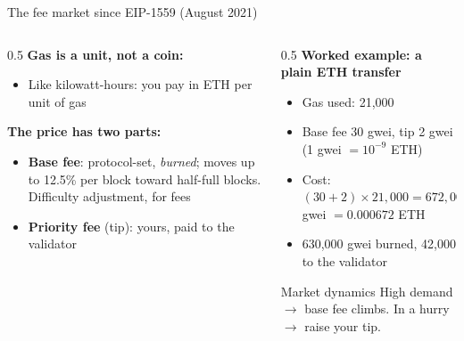 \ifdefined\PRESENTATION\else\PassOptionsToClass{handout}{beamer}\fi\documentclass[aspectratio=169, lualatex]{beamer}
\begin{document}
\begin{frame}{The fee market since EIP-1559 (August 2021)}
	\begin{columns}[c]
		\begin{column}{0.5\textwidth}
			\textbf{Gas is a unit, not a coin:}
			\begin{itemize}
				\item Like kilowatt-hours: you pay in ETH per unit of gas
			\end{itemize}
			\textbf{The price has two parts:}
			\begin{itemize}
				\item \textbf{Base fee}: protocol-set, \emph{burned}; moves up to 12.5\% per block toward half-full blocks. Difficulty adjustment, for fees
				\item \textbf{Priority fee} (tip): yours, paid to the validator
			\end{itemize}
		\end{column}
		\begin{column}{0.5\textwidth}
			\textbf{Worked example: a plain ETH transfer}
			\begin{itemize}
				\item Gas used: 21,000
				\item Base fee 30 gwei, tip 2 gwei (1 gwei $= 10^{-9}$ ETH)
				\item Cost: $(30 + 2) \times 21{,}000 = 672{,}000$ gwei $= 0.000672$ ETH
				\item 630,000 gwei burned, 42,000 to the validator
			\end{itemize}
			\begin{exampleblock}{Market dynamics}
				High demand $\rightarrow$ base fee climbs. In a hurry $\rightarrow$ raise your tip.
			\end{exampleblock}
		\end{column}
	\end{columns}
\end{frame}
\end{document}
